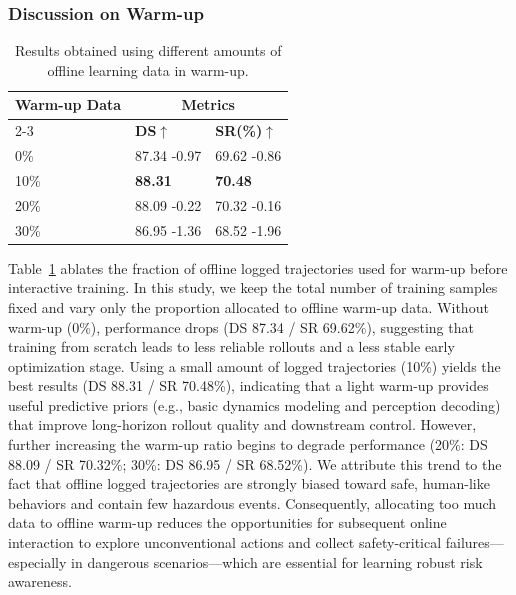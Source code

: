 \documentclass[twocolumn]{template}
\theoremstyle{thmstyleone}%
\theoremstyle{thmstyletwo}%
\theoremstyle{thmstylethree}%
\begin{document}
\subsubsection{Discussion on Warm-up}

\begin{table}[t]
    \centering
    \setlength{\tabcolsep}{6pt}
    \caption{Results obtained using different amounts of offline learning data in warm-up.}
    \begin{tabular}{lll}
        \toprule
        \multirow{2.5}{*}{\textbf{Warm-up Data}} & \multicolumn{2}{c}{\textbf{Metrics}} \\
        \cmidrule(lr){2-3}
        & \textbf{DS$\uparrow$} & \textbf{SR(\%)$\uparrow$} \\
        \midrule
        0\%
            & 87.34 {\tiny\color{red} -0.97}
            & 69.62 {\tiny\color{red} -0.86} \\
        10\%
            & \textbf{88.31}
            & \textbf{70.48} \\
        20\% 
            & 88.09 {\tiny\color{red} -0.22}
            & 70.32 {\tiny\color{red} -0.16} \\
        30\%
            & 86.95 {\tiny\color{red} -1.36}
            & 68.52 {\tiny\color{red} -1.96} \\
        \bottomrule
    \end{tabular}
    \label{tab:warmup}
\end{table}

Table~\ref{tab:warmup} ablates the fraction of offline logged trajectories used for warm-up before interactive training. In this study, we keep the total number of training samples fixed and vary only the proportion allocated to offline warm-up data.
Without warm-up (0\%), performance drops (DS 87.34 / SR 69.62\%), suggesting that training from scratch leads to less reliable rollouts and a less stable early optimization stage. Using a small amount of logged trajectories (10\%) yields the best results (DS 88.31 / SR 70.48\%), indicating that a light warm-up provides useful predictive priors (e.g., basic dynamics modeling and perception decoding) that improve long-horizon rollout quality and downstream control. However, further increasing the warm-up ratio begins to degrade performance (20\%: DS 88.09 / SR 70.32\%; 30\%: DS 86.95 / SR 68.52\%). We attribute this trend to the fact that offline logged trajectories are strongly biased toward safe, human-like behaviors and contain few hazardous events. Consequently, allocating too much data to offline warm-up reduces the opportunities for subsequent online interaction to explore unconventional actions and collect safety-critical failures—especially in dangerous scenarios—which are essential for learning robust risk awareness.
\end{document}
